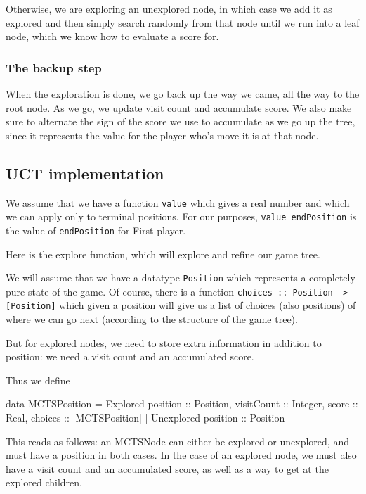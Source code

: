 Otherwise, we are exploring an unexplored node, in which case we add it as explored and then simply search randomly from that node until we run into a leaf node, which we know how to evaluate a score for.

\subsubsection{The backup step}

When the exploration is done, we go back up the way we came, all the way to the root node.
As we go, we update visit count and accumulate score.
We also make sure to alternate the sign of the score we use to accumulate as we go up the tree, since it represents the value for the player who's move it is at that node.


\subsection{UCT implementation}


We assume that we have a function \texttt{value} which gives a real number and which we can apply only to terminal positions.
For our purposes, \texttt{value endPosition} is the value of \texttt{endPosition} for First player.


Here is the explore function, which will explore and refine our game tree.

We will assume that we have a datatype \texttt{Position} which represents a completely pure state of the game.
Of course, there is a function \texttt{choices :: Position -> [Position]} which given a position will give us a list of choices (also positions) of where we can go next (according to the structure of the game tree).

But for explored nodes, we need to store extra information in addition to position: we need a visit count and an accumulated score. 

Thus we define

\begin{code}
  data MCTSPosition = Explored {position :: Position, visitCount :: Integer, score :: Real, choices :: [MCTSPosition]} | Unexplored {position :: Position}
\end{code}

This reads as follows: an MCTSNode can either be explored or unexplored, and must have a position in both cases.
In the case of an explored node, we must also have a visit count and an accumulated score, as well as a way to get at the explored children.



